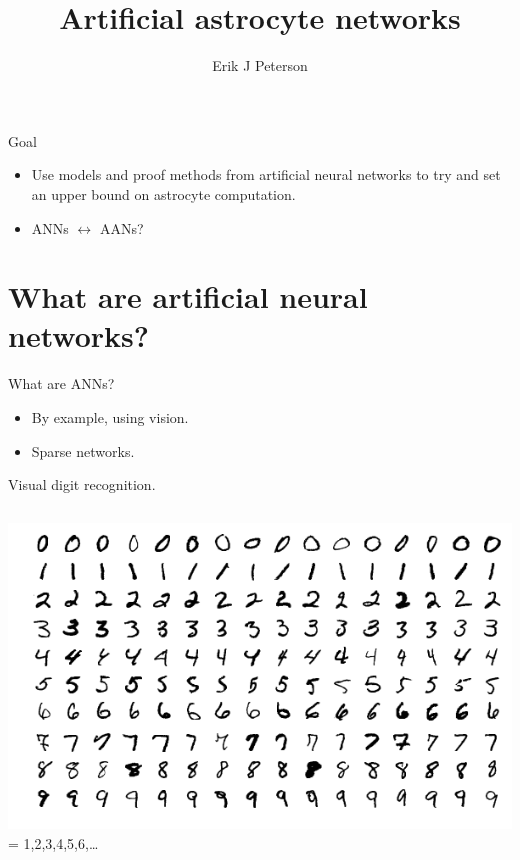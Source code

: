 \documentclass[10pt]{beamer}
\title{Artificial astrocyte networks}
\date{}
\author{Erik J Peterson}
\institute{CoAxLab\\Carnegie Mellon University}
\begin{document}
\maketitle


\begin{frame}[fragile]{Goal}
\begin{itemize}
    \item Use models and proof methods from artificial neural networks to try and set an \alert{upper bound} on astrocyte computation.
    \item ANNs $\leftrightarrow$ AANs?
\end{itemize}
\end{frame}

\section[ANNs]{What are artificial neural networks?}
\begin{frame}[fragile]{What are ANNs?}
\begin{itemize}
\item By example, using vision.
\item Sparse networks.
\end{itemize}
\end{frame}

\begin{frame}[fragile]{Visual digit recognition.}
\begin{columns}
\centering
\includegraphics[scale=0.25]{images/minst.png}
\centering
 = 1,2,3,4,5,6,\ldots
\end{columns}
\end{frame}
\end{document}
